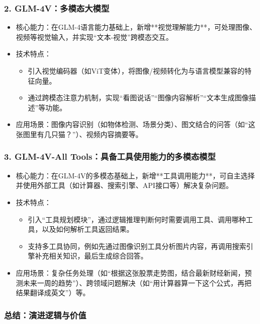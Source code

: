 \subsubsection{2. GLM-4V：多模态大模型}

\begin{itemize}
	\item 核心能力：在GLM-4语言能力基础上，新增**视觉理解能力**，可处理图像、视频等视觉输入，并实现“文本-视觉”跨模态交互。
	\item 技术特点：
		\begin{itemize}
			\item 引入视觉编码器（如ViT变体），将图像/视频转化为与语言模型兼容的特征向量。
			\item 通过跨模态注意力机制，实现“看图说话”“图像内容解析”“文本生成图像描述”等功能。
		\end{itemize}
	\item 应用场景：图像内容识别（如物体检测、场景分类）、图文结合的问答（如“这张图里有几只猫？”）、视频内容摘要等。
\end{itemize}

\subsubsection{3. GLM-4V-All Tools：具备工具使用能力的多模态模型}

\begin{itemize}
	\item 核心能力：在GLM-4V的多模态基础上，新增**工具调用能力**，可自主选择并使用外部工具（如计算器、搜索引擎、API接口等）解决复杂问题。
	\item 技术特点：
		\begin{itemize}
			\item 引入“工具规划模块”，通过逻辑推理判断何时需要调用工具、调用哪种工具，以及如何解析工具返回结果。
			\item 支持多工具协同，例如先通过图像识别工具分析图片内容，再调用搜索引擎补充相关知识，最后生成综合回答。
		\end{itemize}
	\item 应用场景：复杂任务处理（如“根据这张股票走势图，结合最新财经新闻，预测未来一周的趋势”）、跨领域问题解决（如“用计算器算一下这个公式，再把结果翻译成英文”）等。
\end{itemize}

\subsubsection{总结：演进逻辑与价值}

